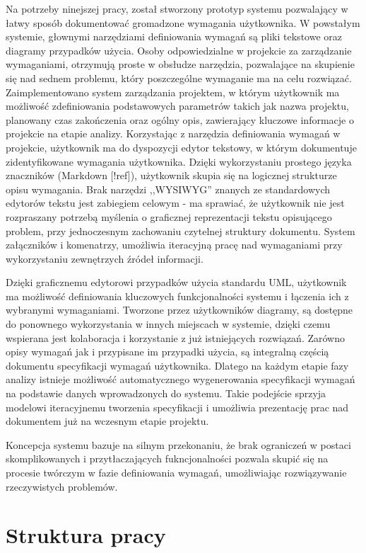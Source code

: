       Na potrzeby ninejszej pracy, został stworzony prototyp systemu pozwalający w łatwy sposób dokumentować gromadzone wymagania użytkownika. W powstałym systemie, głownymi narzędziami definiowania wymagań są pliki tekstowe oraz diagramy przypadków użycia. Osoby odpowiedzialne w projekcie za zarządzanie wymaganiami, otrzymują proste w obsłudze narzędzia, pozwalające na skupienie się nad sednem problemu, który poszczególne wymaganie ma na celu rozwiązać. Zaimplementowano system zarządzania projektem, w którym użytkownik ma możliwość zdefiniowania podstawowych parametrów takich jak nazwa projektu, planowany czas zakończenia oraz ogólny opis, zawierający kluczowe informacje o projekcie na etapie analizy. Korzystając z narzędzia definiowania wymagań w projekcie, użytkownik ma do dyspozycji edytor tekstowy, w którym dokumentuje zidentyfikowane wymagania użytkownika. Dzięki wykorzystaniu prostego języka znaczników (Markdown [!ref]), użytkownik skupia się na logicznej strukturze opisu wymagania. Brak narzędzi ,,WYSIWYG'' znanych ze standardowych edytorów tekstu jest zabiegiem celowym - ma sprawiać, że użytkownik nie jest rozpraszany potrzebą myślenia o graficznej reprezentacji tekstu opisującego problem, przy jednoczesnym zachowaniu czytelnej struktury dokumentu. System załączników i komenatrzy, umożliwia iteracyjną pracę nad wymaganiami przy wykorzystaniu zewnętrzych źródeł informacji. 

      Dzięki graficznemu edytorowi przypadków użycia standardu UML, użytkownik ma możliwość definiowania kluczowych funkcjonalności systemu i łączenia ich z wybranymi wymaganiami. Tworzone przez użytkowników diagramy, są dostępne do ponownego wykorzystania w innych miejscach w systemie, dzięki czemu wspierana jest kolaboracja i korzystanie z już istniejących rozwiązań. Zarówno opisy wymagań jak i przypisane im przypadki użycia, są integralną częścią dokumentu specyfikacji wymagań użytkownika. Dlatego na każdym etapie fazy analizy istnieje możliwość automatycznego wygenerowania specyfikacji wymagań na podstawie danych wprowadzonych do systemu. Takie podejście sprzyja modelowi iteracyjnemu tworzenia specyfikacji i umożliwia prezentację prac nad dokumentem już na wczesnym etapie projektu. 

      Koncepcja systemu bazuje na silnym przekonaniu, że brak ograniczeń w postaci skomplikowanych i przytłaczających fukncjonalności pozwala skupić się na procesie twórczym w fazie definiowania wymagań, umożliwiając rozwiązywanie rzeczywistych problemów. 

    \section{Struktura pracy}

